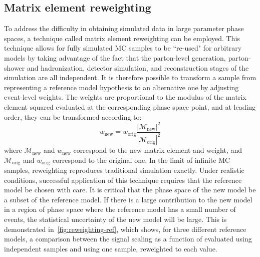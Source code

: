 \subsection{Matrix element reweighting}
To address the difficulty in obtaining simulated data in large parameter phase
spaces, a technique called matrix element reweighting can be employed. This
technique allows for fully simulated MC samples to be ``re-used" for arbitrary
models by taking advantage of the fact that the parton-level generation,
parton-shower and hadronization, detector simulation, and reconstruction stages
of the simulation are all independent. It is therefore possible to transform a
sample from representing a reference model hypothesis to an alternative one by
adjusting event-level weights. The weights are proportional to the modulus of
the matrix element squared evaluated at the corresponding phase space point, and
at leading order, they can be transformed according to:
\begin{equation}
  \label{eq:weighting}
  w_\text{new} = w_\text{orig} \frac{|\mathcal{M}_\text{new}|^2}{|\mathcal{M}_\text{orig}|^2}
\end{equation}
where $\mathcal{M}_\text{new}$ and $w_\text{new}$ correspond to the new matrix element and weight, and $\mathcal{M}_\text{orig}$ and $w_\text{orig}$ correspond to the original one. In the limit of infinite MC samples, reweighting reproduces traditional simulation exactly. Under realistic conditions, successful application of this technique requires that the reference model be chosen with care. It is critical that the phase space of the new model be a subset of the reference model. If there is a large contribution to the new model in a region of phase space where the reference model has a small number of events, the statistical uncertainty of the new model will be large. This is demonstrated in~\cref{fig:reweighting-ref}, which shows, for three different reference models, a comparison between the signal scaling as a function of \cuB evaluated using independent samples and using one sample, reweighted to each \cuB value.

